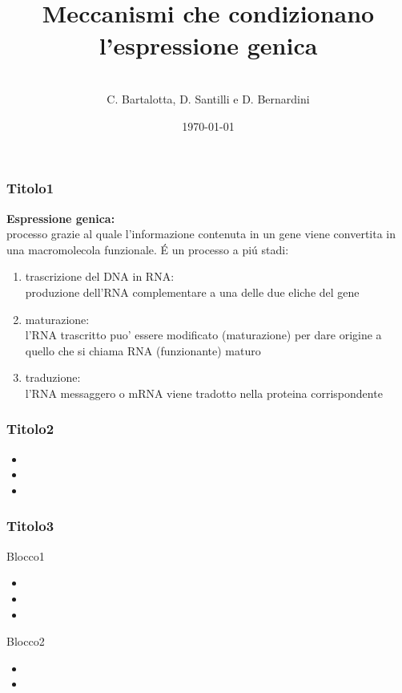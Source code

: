 \documentclass[hyperref={pdfpagelabels=false}]{beamer}
\title{\\Meccanismi che condizionano l'espressione genica\\}
\author{\\ C. Bartalotta, D. Santilli e D. Bernardini}
\date{\today}
\begin{document}
\begin{frame}
\titlepage
\end{frame} 

\begin{frame}\frametitle{Titolo1}
\textbf{Espressione genica:}\\
processo grazie al quale l'informazione contenuta in un gene viene convertita in una macromolecola funzionale.
\'E un processo a pi\'u stadi:\pause 
\begin{enumerate}
\item trascrizione del DNA in RNA:\\
produzione dell'RNA complementare a una delle due eliche del gene  \pause 
\item maturazione:\\
l'RNA trascritto puo' essere modificato (maturazione) per dare origine a quello che si chiama RNA (funzionante) maturo \pause 
\item traduzione:\\
l'RNA messaggero o mRNA viene tradotto nella proteina corrispondente
\end{enumerate}
\end{frame}

\begin{frame}\frametitle{Titolo2}
\begin{itemize}
\item 
\item 
\item 
\end{itemize}
\end{frame}

\begin{frame}\frametitle{Titolo3}
\begin{block}{Blocco1}
\begin{itemize}
\item 
\item 
\item 
\end{itemize}
\end{block}
\begin{exampleblock}{Blocco2}
\begin{itemize}
\item 
\item 
\end{itemize}
\end{exampleblock}
\bigskip
\bigskip
\bigskip
\end{frame}
\end{document}
